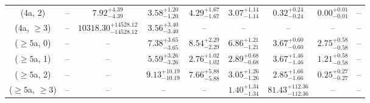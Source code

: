 \begin{table}[h!]
{\begin{tabular}{ccccccccc}
	(4a, 2) & -- & $7.92^{+ 4.39 }_{- 4.39 }$ & $3.58^{+ 1.20 }_{- 1.20 }$ & $4.29^{+ 1.67 }_{- 1.67 }$ & $3.07^{+ 1.14 }_{- 1.14 }$ & $0.32^{+ 0.24 }_{- 0.24 }$ & $0.00^{+ 0.01 }_{- 0.01 }$ & -- \\[0.5ex] 
	(4a, $\ge3$) & -- & $10318.30^{+ 14528.12 }_{- 14528.12 }$ & $3.56^{+ 3.40 }_{- 3.40 }$ & -- & -- & -- & -- & -- \\[0.5ex] 
	($\ge5$a, 0) & -- & -- & $7.38^{+ 3.65 }_{- 3.65 }$ & $8.54^{+ 2.29 }_{- 2.29 }$ & $6.86^{+ 1.21 }_{- 1.21 }$ & $3.67^{+ 0.60 }_{- 0.60 }$ & $2.75^{+ 0.58 }_{- 0.58 }$ & -- \\[0.5ex] 
	($\ge5$a, 1) & -- & -- & $5.59^{+ 3.26 }_{- 3.26 }$ & $2.76^{+ 1.02 }_{- 1.02 }$ & $2.89^{+ 0.68 }_{- 0.68 }$ & $3.67^{+ 1.46 }_{- 1.46 }$ & $1.21^{+ 0.58 }_{- 0.58 }$ & -- \\[0.5ex] 
	($\ge5$a, 2) & -- & -- & $9.13^{+ 10.19 }_{- 10.19 }$ & $7.66^{+ 5.88 }_{- 5.88 }$ & $3.05^{+ 1.26 }_{- 1.26 }$ & $2.85^{+ 1.66 }_{- 1.66 }$ & $0.25^{+ 0.27 }_{- 0.27 }$ & -- \\[0.5ex] 
	($\ge5$a, $\ge3$) & -- & -- & -- & -- & $1.40^{+ 1.34 }_{- 1.34 }$ & $81.43^{+ 112.36 }_{- 112.36 }$ & -- & -- \\[0.5ex] 
	\hline
	\hline
\end{tabular}}
\end{table}
